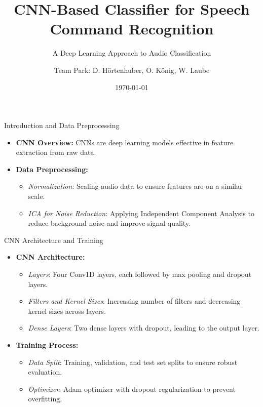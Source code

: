 \documentclass{beamer}
\title{CNN-Based Classifier for Speech Command Recognition}
\subtitle{A Deep Learning Approach to Audio Classification}
\author{Team Park: D. Hörtenhuber, O. König, W. Laube}
\institute{JKU \\ MLPC}
\date{\today}
\begin{document}
\begin{frame}
  \titlepage
\end{frame}

\begin{frame}{Introduction and Data Preprocessing}
  \begin{itemize}
    \item \textbf{CNN Overview:} CNNs are deep learning models effective in feature extraction from raw data.
    \item \textbf{Data Preprocessing:}
      \begin{itemize}
        \item \textit{Normalization}: Scaling audio data to ensure features are on a similar scale.
        \item \textit{ICA for Noise Reduction}: Applying Independent Component Analysis to reduce background noise and improve signal quality.
      \end{itemize}
  \end{itemize}
\end{frame}

\begin{frame}{CNN Architecture and Training}
  \begin{itemize}
    \item \textbf{CNN Architecture:}
      \begin{itemize}
        \item \textit{Layers}: Four Conv1D layers, each followed by max pooling and dropout layers.
        \item \textit{Filters and Kernel Sizes}: Increasing number of filters and decreasing kernel sizes across layers.
        \item \textit{Dense Layers}: Two dense layers with dropout, leading to the output layer.
      \end{itemize}
    \item \textbf{Training Process:}
      \begin{itemize}
        \item \textit{Data Split}: Training, validation, and test set splits to ensure robust evaluation.
        \item \textit{Optimizer}: Adam optimizer with dropout regularization to prevent overfitting.
      \end{itemize}
  \end{itemize}
\end{frame}
\end{document}
